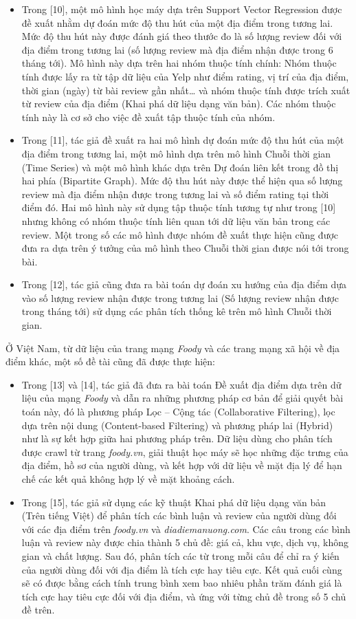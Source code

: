 \documentclass[12pt]{extarticle}
\begin{document}
\begin{itemize}
				\item Trong [10], một mô hình học máy dựa trên Support Vector Regression được đề xuất nhằm dự đoán mức độ thu hút của một địa điểm trong tương lai. Mức độ thu hút này được đánh giá theo thước đo là số lượng review đối với địa điểm trong tương lai (số lượng review mà địa điểm nhận được trong 6 tháng tới). Mô hình này dựa trên hai nhóm thuộc tính chính: Nhóm thuộc tính được lấy ra từ tập dữ liệu của Yelp như điểm rating, vị trí của địa điểm, thời gian (ngày) từ bài review gần nhất… và nhóm thuộc tính được trích xuất từ review của địa điểm (Khai phá dữ liệu dạng văn bản). Các nhóm thuộc tính này là cơ sở cho việc đề xuất tập thuộc tính của nhóm.
				\item Trong [11], tác giả đề xuất ra hai mô hình dự đoán mức độ thu hút của một địa điểm trong tương lai, một mô hình dựa trên mô hình Chuỗi thời gian (Time Series) và một mô hình khác dựa trên Dự đoán liên kết trong đồ thị hai phía (Bipartite Graph). Mức độ thu hút này được thể hiện qua số lượng review mà địa điểm nhận được trong tương lai và số điểm rating tại thời điểm đó. Hai mô hình này sử dụng tập thuộc tính tương tự như trong [10] nhưng không có nhóm thuộc tính liên quan tới dữ liệu văn bản trong các review. Một trong số các mô hình được nhóm đề xuất thực hiện cũng được đưa ra dựa trên ý tưởng của mô hình theo Chuỗi thời gian được nói tới trong bài. 
				\item Trong [12], tác giả cũng đưa ra bài toán dự đoán xu hướng của địa điểm dựa vào số lượng review nhận được trong tương lai (Số lượng review nhận được trong tháng tới) sử dụng các phân tích thống kê trên mô hình Chuỗi thời gian.
			\end{itemize}
			\par Ở Việt Nam, từ dữ liệu của trang mạng \textit{Foody}  và các trang mạng xã hội về địa điểm khác, một số đề tài cũng đã được thực hiện:
			\begin{itemize}
				\item Trong [13] và [14], tác giả đã đưa ra bài toán Đề xuất địa điểm dựa trên dữ liệu của mạng \textit{Foody}  và dẫn ra những phương pháp cơ bản để giải quyết bài toán này, đó là phương pháp Lọc – Cộng tác (Collaborative Filtering), lọc dựa trên nội dung (Content-based Filtering) và phương pháp lai (Hybrid) như là sự kết hợp giữa hai phương pháp trên. Dữ liệu dùng cho phân tích được crawl từ trang \textit{foody.vn}, giải thuật học máy sẽ học những đặc trưng của địa điểm, hồ sơ của người dùng, và kết hợp với dữ liệu về mặt địa lý để hạn chế các kết quả không hợp lý về mặt khoảng cách. 
				\item Trong [15], tác giả sử dụng các kỹ thuật Khai phá dữ liệu dạng văn bản (Trên tiếng Việt) để phân tích các bình luận và review của người dùng đối với các địa điểm trên \textit{foody.vn} và \textit{diadiemanuong.com}. Các câu trong các bình luận và review này được chia thành 5 chủ đề: giá cả, khu vực, dịch vụ, không gian và chất lượng. Sau đó, phân tích các từ trong mỗi câu để chỉ ra ý kiến của người dùng đối với địa điểm là tích cực hay tiêu cực. Kết quả cuối cùng sẽ có được bằng cách tính trung bình xem bao nhiêu phần trăm đánh giá là tích cực hay tiêu cực đối với địa điểm, và ứng với từng chủ đề trong số 5 chủ đề trên.   
				\end{itemize}
\end{document}

